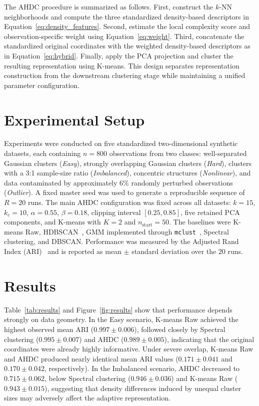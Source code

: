 \documentclass[10pt,twoside]{article}
\numberwithin{equation}{section}
\begin{document}
The AHDC procedure is summarized as follows. First, construct the $k$-NN neighborhoods and compute the three standardized density-based descriptors in Equation~\ref{eq:density_features}. Second, estimate the local complexity score and observation-specific weight using Equation~\ref{eq:weight}. Third, concatenate the standardized original coordinates with the weighted density-based descriptors as in Equation~\ref{eq:hybrid}. Finally, apply the PCA projection and cluster the resulting representation using K-means. This design separates representation construction from the downstream clustering stage while maintaining a unified parameter configuration.



\section{Experimental Setup}

Experiments were conducted on five standardized two-dimensional synthetic datasets, each containing $n=800$ observations from two classes: well-separated Gaussian clusters (\textit{Easy}), strongly overlapping Gaussian clusters (\textit{Hard}), clusters with a 3:1 sample-size ratio (\textit{Imbalanced}), concentric structures (\textit{Nonlinear}), and data contaminated by approximately $6\%$ randomly perturbed observations (\textit{Outlier}). A fixed master seed was used to generate a reproducible sequence of $R=20$ runs. The main AHDC configuration was fixed across all datasets: $k=15$, $k_c=10$, $\alpha=0.55$, $\beta=0.18$, clipping interval $[0.25,0.85]$, five retained PCA components, and K-means with $K=2$ and $n_{\mathrm{start}}=50$. The baselines were K-means Raw, HDBSCAN~\cite{Campello2015}, GMM implemented through \texttt{mclust}~\cite{Scrucca2016}, Spectral clustering, and DBSCAN. Performance was measured by the Adjusted Rand Index (ARI)~\cite{Hubert1985} and is reported as mean $\pm$ standard deviation over the 20 runs.



\section{Results}

Table~\ref{tab:results} and Figure~\ref{fig:results} show that performance depends strongly on data geometry. In the Easy scenario, K-means Raw achieved the highest observed mean ARI ($0.997\pm0.006$), followed closely by Spectral clustering ($0.995\pm0.007$) and AHDC ($0.989\pm0.005$), indicating that the original coordinates were already highly informative. Under severe overlap, K-means Raw and AHDC produced nearly identical mean ARI values ($0.171\pm0.041$ and $0.170\pm0.042$, respectively). In the Imbalanced scenario, AHDC decreased to $0.715\pm0.062$, below Spectral clustering ($0.946\pm0.036$) and K-means Raw ($0.943\pm0.015$), suggesting that density differences induced by unequal cluster sizes may adversely affect the adaptive representation. 
\end{document}
